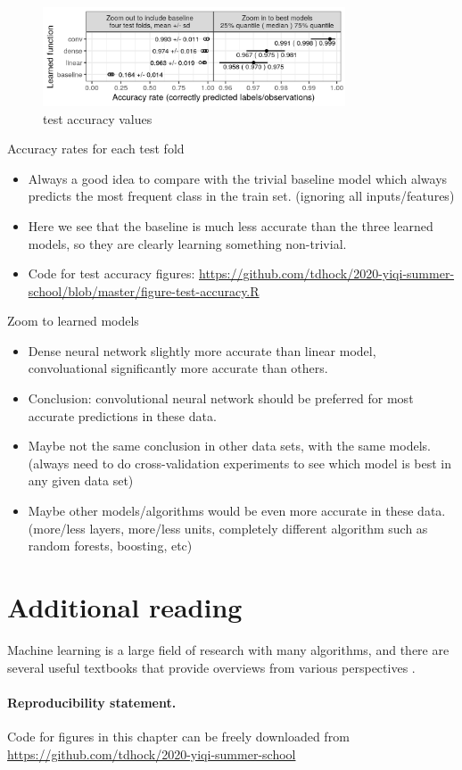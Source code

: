 \documentclass[12pt]{article}
\begin{document}
\begin{figure}
  \centering
  \includegraphics[width=0.8\textwidth]{figure-test-accuracy-both}
  \caption{test accuracy values}
  \label{fig:test-accuracy}
\end{figure}
 
{Accuracy rates for each test fold}
  \begin{itemize}
  \item Always a good idea to compare with the trivial baseline model which always
    predicts the most frequent class in the train set. (ignoring all
    inputs/features) 
  \item Here we see that the baseline is much less accurate than the
    three learned models, so they are clearly learning something non-trivial.
  \item Code for test accuracy figures:
    \url{https://github.com/tdhock/2020-yiqi-summer-school/blob/master/figure-test-accuracy.R}
  \end{itemize}

{Zoom to learned models}
\begin{itemize}
\item Dense neural network slightly more accurate
  than linear model, convoluational significantly more
  accurate than others.
\item Conclusion: convolutional neural network should be preferred
  for most accurate predictions in these data.
\item Maybe not the same conclusion in other data sets, with the
  same models. (always need to do cross-validation experiments to
  see which model is best in any given data set)
\item Maybe other models/algorithms would be even more accurate in
  these data. (more/less layers, more/less units, completely
  different algorithm such as random forests, boosting, etc)
\end{itemize}

\section{Additional reading}

Machine learning is a large field of research with many algorithms,
and there are several useful textbooks that provide overviews from
various perspectives \citep{Bishop2006, Hastie2009, Wasserman2010,
  Murphy2013, Goodfellow2016}.

\paragraph{Reproducibility statement.} Code for figures in this
chapter can be freely downloaded from
\url{https://github.com/tdhock/2020-yiqi-summer-school}


 
\end{document}
